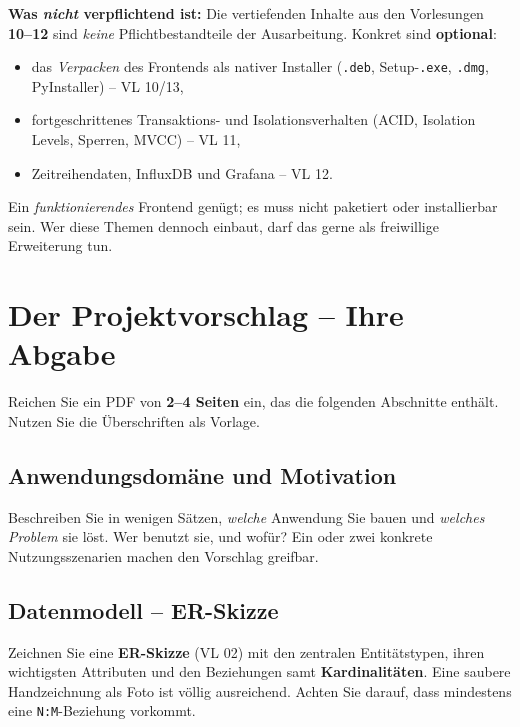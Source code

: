 \documentclass[11pt,a4paper]{article}
\begin{document}
\begin{infobox}
\textbf{Was \emph{nicht} verpflichtend ist:} Die vertiefenden Inhalte aus den
Vorlesungen \textbf{10--12} sind \emph{keine} Pflichtbestandteile der
Ausarbeitung. Konkret sind \textbf{optional}:
\begin{itemize}[leftmargin=1.4em, topsep=2pt]
  \item das \emph{Verpacken} des Frontends als nativer Installer
        (\texttt{.deb}, Setup-\texttt{.exe}, \texttt{.dmg}, PyInstaller) -- VL 10/13,
  \item fortgeschrittenes Transaktions- und Isolationsverhalten (ACID,
        Isolation Levels, Sperren, MVCC) -- VL 11,
  \item Zeitreihendaten, InfluxDB und Grafana -- VL 12.
\end{itemize}
Ein \emph{funktionierendes} Frontend genügt; es muss nicht paketiert oder
installierbar sein. Wer diese Themen dennoch einbaut, darf das gerne als
freiwillige Erweiterung tun.
\end{infobox}

\section{Der Projektvorschlag -- Ihre Abgabe}

Reichen Sie ein PDF von \textbf{2--4 Seiten} ein, das die folgenden Abschnitte
enthält. Nutzen Sie die Überschriften als Vorlage.

\subsection{Anwendungsdomäne und Motivation}

Beschreiben Sie in wenigen Sätzen, \emph{welche} Anwendung Sie bauen und
\emph{welches Problem} sie löst. Wer benutzt sie, und wofür? Ein oder zwei
konkrete Nutzungsszenarien machen den Vorschlag greifbar.

\subsection{Datenmodell -- ER-Skizze}

Zeichnen Sie eine \textbf{ER-Skizze} (VL 02) mit den zentralen Entitätstypen,
ihren wichtigsten Attributen und den Beziehungen samt \textbf{Kardinalitäten}.
Eine saubere Handzeichnung als Foto ist völlig ausreichend. Achten Sie darauf,
dass mindestens eine \texttt{N:M}-Beziehung vorkommt.
\end{document}
